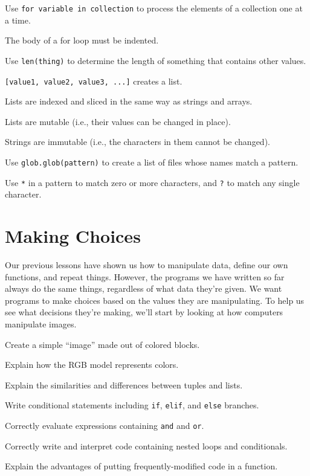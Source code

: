 \begin{keypoints}
\begin{swcitemize}
\item
  Use \texttt{for variable in collection} to process the elements of a
  collection one at a time.
\item
  The body of a for loop must be indented.
\item
  Use \texttt{len(thing)} to determine the length of something that
  contains other values.
\item
  \texttt{{[}value1, value2, value3, ...{]}} creates a list.
\item
  Lists are indexed and sliced in the same way as strings and arrays.
\item
  Lists are mutable (i.e., their values can be changed in place).
\item
  Strings are immutable (i.e., the characters in them cannot be
  changed).
\item
  Use \texttt{glob.glob(pattern)} to create a list of files whose names
  match a pattern.
\item
  Use \texttt{*} in a pattern to match zero or more characters, and
  \texttt{?} to match any single character.
\end{swcitemize}
\end{keypoints}

\section{Making Choices}

Our previous lessons have shown us how to manipulate data, define our
own functions, and repeat things. However, the programs we have written
so far always do the same things, regardless of what data they're given.
We want programs to make choices based on the values they are
manipulating. To help us see what decisions they're making, we'll start
by looking at how computers manipulate images.

\begin{objectives}
\begin{swcitemize}
\item
  Create a simple ``image'' made out of colored blocks.
\item
  Explain how the RGB model represents colors.
\item
  Explain the similarities and differences between tuples and lists.
\item
  Write conditional statements including \texttt{if}, \texttt{elif}, and
  \texttt{else} branches.
\item
  Correctly evaluate expressions containing \texttt{and} and
  \texttt{or}.
\item
  Correctly write and interpret code containing nested loops and
  conditionals.
\item
  Explain the advantages of putting frequently-modified code in a
  function.
\end{swcitemize}
\end{objectives}


